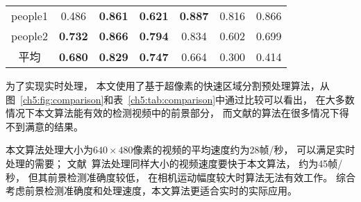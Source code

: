 \begin{table}[htb]
\begin{tabular}{ccccccc}
\multicolumn{1}{c}{people1}&\multicolumn{1}{c}{{0.486}}&\multicolumn{1}{c}{\textbf{0.861}}&\multicolumn{1}{c}{\textbf{0.621}}&\multicolumn{1}{c}{\textbf{0.887}}&\multicolumn{1}{c}{0.816}&\multicolumn{1}{c}{0.866}\\
\multicolumn{1}{c}{people2}&\multicolumn{1}{c}{\textbf{0.732}}&\multicolumn{1}{c}{\textbf{0.866}}&\multicolumn{1}{c}{\textbf{0.794}}&\multicolumn{1}{c}{0.834}&\multicolumn{1}{c}{0.602}&\multicolumn{1}{c}{0.699}\\
\hline
\multicolumn{1}{c}{平均}&\multicolumn{1}{c}{\textbf{0.680}}&\multicolumn{1}{c}{\textbf{0.829}}&\multicolumn{1}{c}{\textbf{0.747}}&\multicolumn{1}{c}{0.664}&\multicolumn{1}{c}{0.300}&\multicolumn{1}{c}{0.414}\\
\bottomrule[1.5pt]

\end{tabular}

\end{table}

 为了实现实时处理， 本文使用了基于超像素的快速区域分割预处理算法，从图~\ref{ch5:fig:comparison}和表~\ref{ch5:tab:comparison}中通过比较可以看出， 在大多数情况下本文算法能有效的检测视频中的前景部分， 而文献的算法在很多情况下得不到满意的结果。\par
本文算法处理大小为$640 \times 480$像素的视频的平均速度约为28帧/秒， 可以满足实时处理的需要； 文献~算法处理同样大小的视频速度要快于本文算法， 约为45帧/秒， 但其前景检测准确度较低， 在相机运动幅度较大时算法无法有效工作。 综合考虑前景检测准确度和处理速度，本文算法更适合实时的实际应用。


